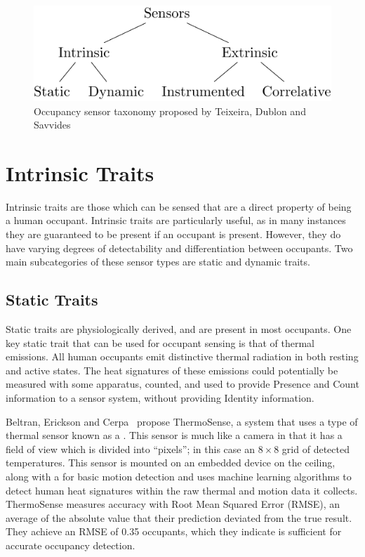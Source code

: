 \documentclass[../thesis/thesis.tex]{subfiles}
\begin{document}
\begin{figure}
\centering
\includegraphics{../diagrams/category-tree.pdf}
\caption{Occupancy sensor taxonomy proposed by Teixeira, Dublon and Savvides~\cite{teixeira2010survey}}
\label{fig:litreview:taxonomy}
\end{figure}

\section{Intrinsic Traits}
\label{subsec:litreview:sensors:intrinsic}

Intrinsic traits are those which can be sensed that are a direct property of being a human occupant. Intrinsic traits are particularly useful, as in many instances they are guaranteed to be present if an occupant is present. However, they do have varying degrees of detectability and differentiation between occupants. Two main subcategories of these sensor types are static and dynamic traits.

\subsection{Static Traits}
\label{subsubsec:litreview:sensors:intrinsic:static}
Static traits are physiologically derived, and are present in most occupants. One key static trait that can be used for occupant sensing is that of thermal emissions. All human occupants emit distinctive thermal radiation in both resting and active states. The heat signatures of these emissions could potentially be measured with some apparatus, counted, and used to provide Presence and Count information to a sensor system, without providing Identity information.

Beltran, Erickson and Cerpa~\cite{beltran2013thermosense} propose ThermoSense, a system that uses a type of thermal sensor known as a \iar. This sensor is much like a camera in that it has a field of view which is divided into ``pixels''; in this case an $8\times8$ grid of detected temperatures. This sensor is mounted on an embedded device on the ceiling, along with a \pir for basic motion detection and uses machine learning algorithms to detect human heat signatures within the raw thermal and motion data it collects. ThermoSense measures accuracy with Root Mean Squared Error (RMSE), an average of the absolute value that their prediction deviated from the true result. They achieve an RMSE of 0.35 occupants, which they indicate is sufficient for accurate occupancy detection.
\end{document}
